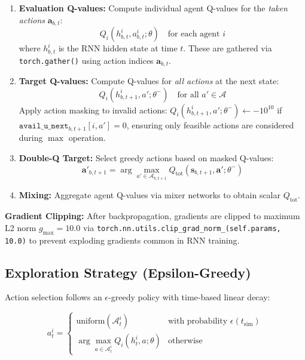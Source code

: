 \begin{enumerate}
\item \textbf{Evaluation Q-values:} Compute individual agent Q-values for the \textit{taken actions} \(\mathbf{a}_{b,t}\):
\[
Q_i(h_{b,t}^i, a_{b,t}^i; \theta) \quad \text{for each agent } i
\]
where \(h_{b,t}^i\) is the RNN hidden state at time \(t\). These are gathered via \texttt{torch.gather()} using action indices \(\mathbf{a}_{b,t}\).

\item \textbf{Target Q-values:} Compute Q-values for \textit{all actions} at the next state:
\[
Q_i(h_{b,t+1}^i, a'; \theta^-) \quad \text{for all } a' \in \mathcal{A}
\]
Apply action masking to invalid actions: \(Q_i(h_{b,t+1}^i, a'; \theta^-) \leftarrow -10^{10}\) if \(\texttt{avail\_u\_next}_{b,t+1}[i,a'] = 0\), ensuring only feasible actions are considered during \(\max\) operation.

\item \textbf{Double-Q Target:} Select greedy actions based on masked Q-values:
\[
\mathbf{a}'_{b,t+1} = \arg\max_{a' \in \mathcal{A}_{b,t+1}} Q_{\text{tot}}(\mathbf{s}_{b,t+1}, \mathbf{a}'; \theta^-)
\]

\item \textbf{Mixing:} Aggregate agent Q-values via mixer networks to obtain scalar \(Q_{\text{tot}}\).
\end{enumerate}

\textbf{Gradient Clipping:} After backpropagation, gradients are clipped to maximum L2 norm \(g_{\max} = 10.0\) via \texttt{torch.nn.utils.clip\_grad\_norm\_(self.params, 10.0)} to prevent exploding gradients common in RNN training.

\subsection{Exploration Strategy (Epsilon-Greedy)}
\label{sec:exploration}

Action selection follows an \(\epsilon\)-greedy policy with time-based linear decay:

\begin{equation}
a_t^i = 
\begin{cases}
\text{uniform}(\mathcal{A}_t^i) & \text{with probability } \epsilon(t_{\text{sim}}) \\
\arg\max_{a \in \mathcal{A}_t^i} Q_i(h_t^i, a; \theta) & \text{otherwise}
\end{cases}
\end{equation}

